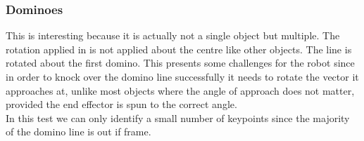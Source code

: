 \subsubsection{Dominoes}
This  is interesting because it is actually not a single object but multiple. The rotation applied in  is not applied about the centre like other objects. The line is rotated about the first domino. This presents some challenges for the robot since in order to knock over the domino line successfully it needs to rotate the vector it approaches at, unlike most objects where the angle of approach does not matter, provided the end effector is spun to the correct angle.\\

In this test we can only identify a small number of keypoints since the majority of the domino line is out if frame.



